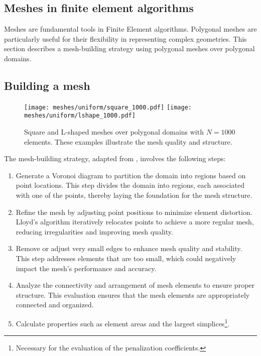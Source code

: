 \subsection{Meshes in finite element algorithms}

Meshes are fundamental tools in Finite Element algorithms. Polygonal meshes are particularly useful for their flexibility in representing complex geometries. This section describes a mesh-building strategy using polygonal meshes over polygonal domains.

\subsection{Building a mesh}

\begin{figure}[!ht]
    \centering
    \texttt{[image: meshes/uniform/square\_1000.pdf]}
    \texttt{[image: meshes/uniform/lshape\_1000.pdf]}
    \caption{Square and L-shaped meshes over polygonal domains with $N = 1000$ elements. These examples illustrate the mesh quality and structure.}
\end{figure}

The mesh-building strategy, adapted from \cite{Talischi2012}, involves the following steps:

\begin{enumerate}
    \item Generate a Voronoi diagram to partition the domain into regions based on point locations. This step divides the domain into regions, each associated with one of the points, thereby laying the foundation for the mesh structure.
    \item Refine the mesh by adjusting point positions to minimize element distortion. Lloyd's algorithm iteratively relocates points to achieve a more regular mesh, reducing irregularities and improving mesh quality.
    \item Remove or adjust very small edges to enhance mesh quality and stability. This step addresses elements that are too small, which could negatively impact the mesh's performance and accuracy.
    \item Analyze the connectivity and arrangement of mesh elements to ensure proper structure. This evaluation ensures that the mesh elements are appropriately connected and organized.
    \item Calculate properties such as element areas and the largest simplices\footnote{Necessary for the evaluation of the penalization coefficients.}.
\end{enumerate}


